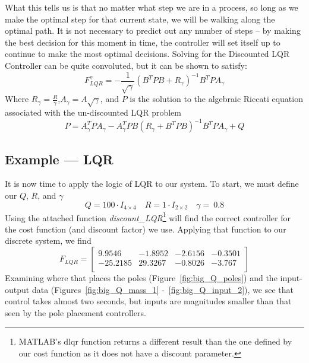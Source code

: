 What this tells us is that no matter what step we are in a process, so long as we make the optimal step for that current state, we will be walking along the optimal path. It is not necessary to predict out any number of steps -- by making the best decision for this moment in time, the controller will set itself up to continue to make the most optimal decisions. Solving for the Discounted LQR Controller can be quite convoluted, but it can be shown to satisfy:
\begin{equation}
    F_{LQR}^\gamma=-\frac{1}{\sqrt\gamma}{\left(B^T PB+R_\gamma\right)}^{-1} B^T PA_\gamma
    \label{eq:discounted_LQR_solution}
\end{equation}
Where $R_\gamma=\frac{R}{\gamma}$,$A_\gamma=A\sqrt\gamma$, and $P$ is the solution to the algebraic Riccati equation associated with the un-discounted LQR problem
\begin{equation}
    P=A_\gamma^T PA_\gamma-A_\gamma^T PB{\left(R_\gamma+B^T PB\right)}^{-1}B^T PA_\gamma+Q
    \label{eq:LQR_solution}
\end{equation}


\FloatBarrier\subsection{Example --- LQR} %
It is now time to apply the logic of LQR to our system. To start, we must define our $Q$, $R$, and $\gamma$
\begin{equation}
    Q=100\cdot I_{4 \times 4} \quad R=1\cdot I_{2 \times 2} \quad \gamma=\ 0.8
    \label{eq:LQR_params_SMD}
\end{equation}
Using the attached function \textit{discount\_LQR}\footnote{MATLAB's dlqr function returns a different result than the one defined by our cost function as it does not have a discount parameter.} will find the correct controller for the cost function (and discount factor) we use. Applying that function to our discrete system, we find
\begin{equation}
    F_{LQR}=\left[\begin{matrix}9.9546&-1.8952&-2.6156&-0.3501\\-25.2185&29.3267&-0.8026&-3.767\\\end{matrix}\right]
    \label{eq:F_lqr}
\end{equation}
Examining where that places the poles (Figure~\ref{fig:big_Q_poles}) and the input-output data (Figures~\ref{fig:big_Q_mass_1} -~\ref{fig:big_Q_input_2}), we see that control takes almost two seconds, but inputs are magnitudes smaller than that seen by the pole placement controllers.

